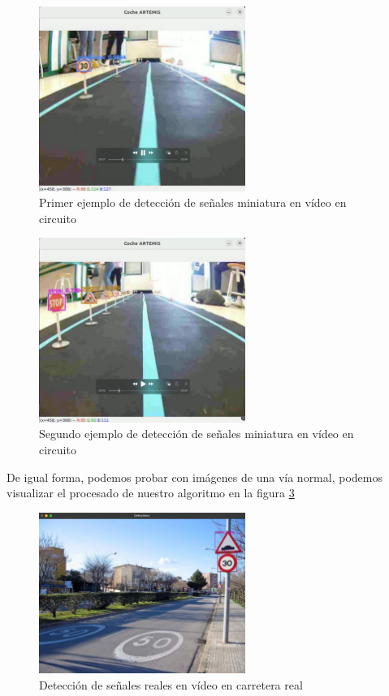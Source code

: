 \begin{figure}[H]
    \centering
 	\includegraphics[width=0.6\textwidth]{Imagenes/IA/deteccion1.pdf}
    \caption{Primer ejemplo de detección de señales miniatura en vídeo en circuito}
    \label{deteccion1}
\end{figure}

\begin{figure}[H]
    \centering
 	\includegraphics[width=0.6\textwidth]{Imagenes/IA/deteccion2.pdf}
    \caption{Segundo ejemplo de detección de señales miniatura en vídeo en circuito}
    \label{deteccion2}
\end{figure}

De igual forma, podemos probar con imágenes de una vía normal, podemos visualizar el procesado de nuestro algoritmo en la figura \ref{deteccion3}\\

\begin{figure}[H]
    \centering
 	\includegraphics[width=0.6\textwidth]{Imagenes/IA/deteccion3.pdf}
    \caption{Detección de señales reales en vídeo en carretera real}
    \label{deteccion3}
\end{figure}

